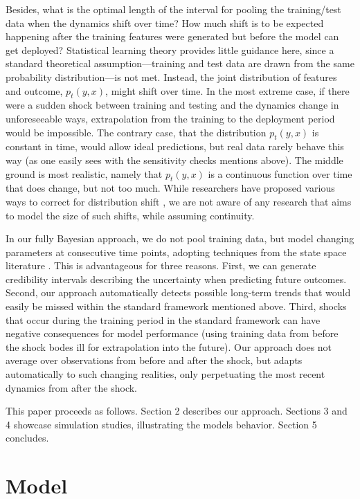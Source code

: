 \documentclass{article}
\begin{document}
Besides, what is the optimal length of the interval for pooling the training/test data when the dynamics shift over time? How much shift is to be expected happening after the training features were generated but before the model can get deployed? Statistical learning theory provides little guidance here, since a standard theoretical assumption---training and test data are drawn from the same probability distribution---is not met. Instead, the joint distribution of features and outcome, $p_t(y, x)$, might shift over time. In the most extreme case, if there were a sudden shock between training and testing and the dynamics change in unforeseeable ways, extrapolation from the training to the deployment period would be impossible. The contrary case, that the distribution $p_t(y, x)$ is constant in time, would allow ideal predictions, but real data rarely behave this way (as one easily sees with the sensitivity checks mentions above). The middle ground is most realistic, namely that $p_t(y, x)$ is a continuous function over time that does change, but not too much. While researchers have proposed various ways to correct for distribution shift \citep[e.g.,][pp. 133]{kim_universal_2022, varshney_trustworthy_2021}, we are not aware of any research that aims to model the size of such shifts, while assuming continuity.

In our fully Bayesian approach, we do not pool training data, but model changing parameters at consecutive time points, adopting techniques from the state space literature \citep[e.g.,][]{durbin_time_2012}. This is advantageous for three reasons. First, we can generate credibility intervals describing the uncertainty when predicting future outcomes. Second, our approach automatically detects possible long-term trends that would easily be missed within the standard framework mentioned above. Third, shocks that occur during the training period in the standard framework can have negative consequences for model performance (using training data from before the shock bodes ill for extrapolation into the future). Our approach does not average over observations from before and after the shock, but adapts automatically to such changing realities, only perpetuating the most recent dynamics from after the shock.

This paper proceeds as follows. Section 2 describes our approach. Sections 3 and 4 showcase simulation studies, illustrating the models behavior. Section 5 concludes.

\section{Model}\label{sec:model}
\end{document}
